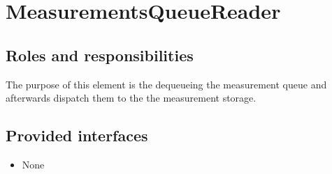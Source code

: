 \section{MeasurementsQueueReader}
\label{element:measurements-queue-reader}

\subsection{Roles and responsibilities}

\npar The purpose of this element is the dequeueing the measurement
queue and afterwards dispatch them to the the measurement storage.

\subsection{Provided interfaces}

\begin{itemize}
  \item None
\end{itemize}

